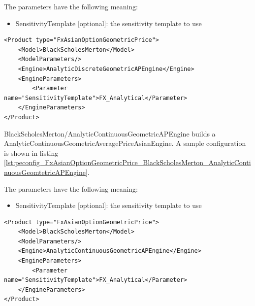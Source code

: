 The parameters have the following meaning:

\begin{itemize}
\item SensitivityTemplate [optional]: the sensitivity template to use
\end{itemize}

\begin{longlisting}
\begin{verbatim}
<Product type="FxAsianOptionGeometricPrice">
    <Model>BlackScholesMerton</Model>
    <ModelParameters/>
    <Engine>AnalyticDiscreteGeometricAPEngine</Engine>
    <EngineParameters>
        <Parameter name="SensitivityTemplate">FX_Analytical</Parameter>
    </EngineParameters>
</Product>
\end{verbatim}
\caption{Configuration for Product FxAsianOptionGeometricPrice, Model BlackScholesMerton, Engine AnalyticDiscreteGeomtetricAPEngine}
\label{lst:peconfig_FxAsianOptionGeometricPrice_BlackScholesMerton_AnalyticDiscreteGeomtetricAPEngine}
\end{longlisting}

BlackScholesMerton/AnalyticContinuousGeometricAPEngine builds a AnalyticContinuousGeometricAveragePriceAsianEngine. A sample
configuration is shown in listing
\ref{lst:peconfig_FxAsianOptionGeometricPrice_BlackScholesMerton_AnalyticContinuousGeomtetricAPEngine}.

The parameters have the following meaning:

\begin{itemize}
\item SensitivityTemplate [optional]: the sensitivity template to use
\end{itemize}

\begin{longlisting}
\begin{verbatim}
<Product type="FxAsianOptionGeometricPrice">
    <Model>BlackScholesMerton</Model>
    <ModelParameters/>
    <Engine>AnalyticContinuousGeometricAPEngine</Engine>
    <EngineParameters>
        <Parameter name="SensitivityTemplate">FX_Analytical</Parameter>
    </EngineParameters>
</Product>
\end{verbatim}
\caption{Configuration for Product FxAsianOptionGeometricPrice, Model BlackScholesMerton, Engine AnalyticContinuousGeomtetricAPEngine}
\label{lst:peconfig_FxAsianOptionGeometricPrice_BlackScholesMerton_AnalyticContinuousGeomtetricAPEngine}
\end{longlisting}

